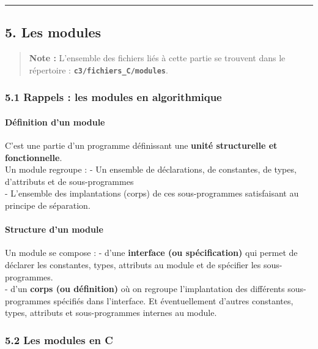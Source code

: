 \documentclass[11pt]{article}
\begin{document}
    \begin{center}\rule{0.5\linewidth}{\linethickness}\end{center}

    \subsection{5. Les modules}\label{les-modules}

\begin{quote}
\textbf{Note :} L'ensemble des fichiers liés à cette partie se trouvent
dans le répertoire : \textbf{\texttt{c3/fichiers\_C/modules}}.
\end{quote}

    \subsubsection{5.1 Rappels : les modules en
algorithmique}\label{rappels-les-modules-en-algorithmique}

\paragraph{Définition d'un module}\label{duxe9finition-dun-module}

C'est une partie d'un programme définissant une \textbf{unité
structurelle et fonctionnelle}.\\
Un module regroupe : - Un ensemble de déclarations, de constantes, de
types, d'attributs et de sous-programmes\\
- L'ensemble des implantations (corps) de ces sous-programmes
satisfaisant au principe de séparation.

\paragraph{Structure d'un module}\label{structure-dun-module}

Un module se compose : - d'une \textbf{interface (ou spécification)} qui
permet de déclarer les constantes, types, attributs au module et de
spécifier les sous-programmes.\\
- d'un \textbf{corps (ou définition)} où on regroupe l'implantation des
différents sous-programmes spécifiés dans l'interface. Et éventuellement
d'autres constantes, types, attributs et sous-programmes internes au
module.

    \subsubsection{5.2 Les modules en C}\label{les-modules-en-c}
\end{document}
